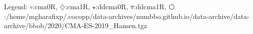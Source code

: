 Legend: {\color{NavyBlue}$\circ$}:cma0R, {\color{Magenta}$\diamondsuit$}:cma1R, {\color{Orange}$\star$}:ddcma0R, {\color{CornflowerBlue}$\triangledown$}:ddcma1R, {\color{red}$\varhexagon$}:/home/mgharafixp/.cocopp/data-archives/numbbo.github.io/data-archive/data-archive/bbob/2020/CMA-ES-2019\_Hansen.tgz